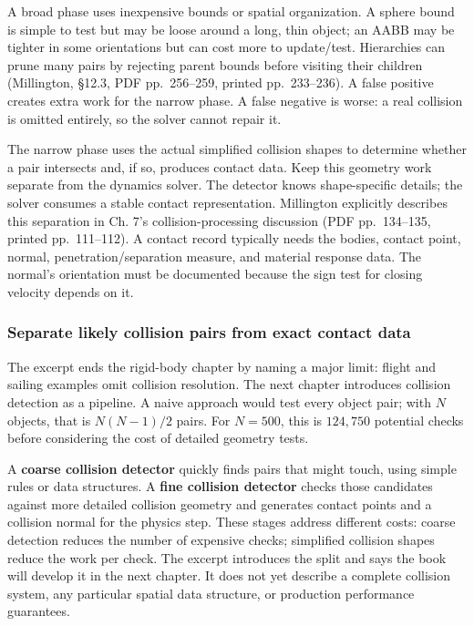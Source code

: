 A broad phase uses inexpensive bounds or spatial organization. A sphere bound is simple to test but may be loose around a long, thin object; an AABB may be tighter in some orientations but can cost more to update/test. Hierarchies can prune many pairs by rejecting parent bounds before visiting their children (Millington, §12.3, PDF pp.~256--259, printed pp.~233--236). A false positive creates extra work for the narrow phase. A false negative is worse: a real collision is omitted entirely, so the solver cannot repair it.

The narrow phase uses the actual simplified collision shapes to determine whether a pair intersects and, if so, produces contact data. Keep this geometry work separate from the dynamics solver. The detector knows shape-specific details; the solver consumes a stable contact representation. Millington explicitly describes this separation in Ch. 7's collision-processing discussion (PDF pp.~134--135, printed pp.~111--112). A contact record typically needs the bodies, contact point, normal, penetration/separation measure, and material response data. The normal's orientation must be documented because the sign test for closing velocity depends on it.

\subsubsection{Separate likely collision pairs from exact contact data}\label{06-engine-ii-ch033-separate-likely-collision-pairs-from-exact-contact-data}

The excerpt ends the rigid-body chapter by naming a major limit: flight and sailing examples omit collision resolution. The next chapter introduces collision detection as a pipeline. A naive approach would test every object pair; with \(N\) objects, that is \(N(N-1)/2\) pairs. For \(N=500\), this is \(124{,}750\) potential checks before considering the cost of detailed geometry tests.

A \textbf{coarse collision detector} quickly finds pairs that might touch, using simple rules or data structures. A \textbf{fine collision detector} checks those candidates against more detailed collision geometry and generates contact points and a collision normal for the physics step. These stages address different costs: coarse detection reduces the number of expensive checks; simplified collision shapes reduce the work per check. The excerpt introduces the split and says the book will develop it in the next chapter. It does not yet describe a complete collision system, any particular spatial data structure, or production performance guarantees.

